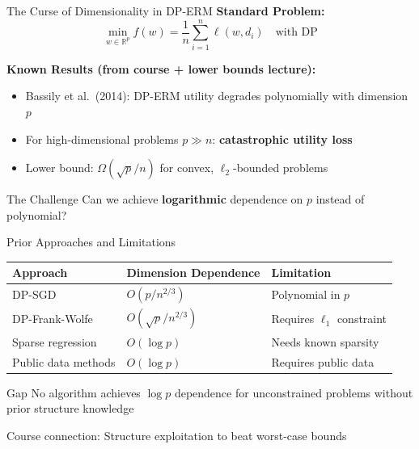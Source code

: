 \documentclass{beamer}
\begin{document}
\begin{frame}{The Curse of Dimensionality in DP-ERM}
\textbf{Standard Problem:}
\[
\min_{w \in \mathbb{R}^p} f(w) = \frac{1}{n} \sum_{i=1}^{n} \ell(w, d_i) \quad \text{with DP}
\]

\vspace{1em}

\textbf{Known Results (from course + lower bounds lecture):}
\begin{itemize}
\item Bassily et al.\ (2014): DP-ERM utility degrades \alert{polynomially} with dimension $p$
\item For high-dimensional problems $p \gg n$: \textbf{catastrophic utility loss}
\item Lower bound: $\Omega(\sqrt{p}/n)$ for convex, $\ell_2$-bounded problems
\end{itemize}

\vspace{1em}

\begin{block}{The Challenge}
Can we achieve \textbf{logarithmic} dependence on $p$ instead of polynomial?
\end{block}
\end{frame}

\begin{frame}{Prior Approaches and Limitations}
\begin{table}
\footnotesize
\begin{tabular}{l|l|l}
\textbf{Approach} & \textbf{Dimension Dependence} & \textbf{Limitation} \\ \hline
DP-SGD & $O(p / n^{2/3})$ & Polynomial in $p$ \\
DP-Frank-Wolfe & $O(\sqrt{p} / n^{2/3})$ & Requires $\ell_1$ constraint \\
Sparse regression & $O(\log p)$ & Needs known sparsity \\
Public data methods & $O(\log p)$ & Requires public data \\
\end{tabular}
\end{table}

\vspace{1em}

\begin{alertblock}{Gap}
No algorithm achieves $\log p$ dependence for unconstrained problems without prior structure knowledge
\end{alertblock}

\vspace{0.5em}

\alert{Course connection:} Structure exploitation to beat worst-case bounds
\end{frame}
\end{document}
